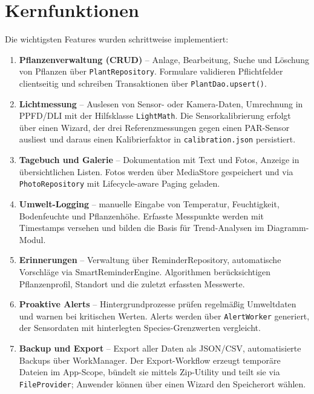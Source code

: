 \documentclass[14pt,a4paper]{report}
\begin{document}
\section{Kernfunktionen}
Die wichtigsten Features wurden schrittweise implementiert:
\begin{enumerate}
    \item \textbf{Pflanzenverwaltung (CRUD)} – Anlage, Bearbeitung, Suche und Löschung von Pflanzen über \texttt{PlantRepository}. Formulare validieren Pflichtfelder clientseitig und schreiben Transaktionen über \texttt{PlantDao.upsert()}.
    \item \textbf{Lichtmessung} – Auslesen von Sensor- oder Kamera-Daten, Umrechnung in PPFD/DLI mit der Hilfsklasse \texttt{LightMath}. Die Sensorkalibrierung erfolgt über einen Wizard, der drei Referenzmessungen gegen einen PAR-Sensor ausliest und daraus einen Kalibrierfaktor in \texttt{calibration.json} persistiert.
    \item \textbf{Tagebuch und Galerie} – Dokumentation mit Text und Fotos, Anzeige in übersichtlichen Listen. Fotos werden über MediaStore gespeichert und via \texttt{PhotoRepository} mit Lifecycle-aware Paging geladen.
    \item \textbf{Umwelt-Logging} – manuelle Eingabe von Temperatur, Feuchtigkeit, Bodenfeuchte und Pflanzenhöhe. Erfasste Messpunkte werden mit Timestamps versehen und bilden die Basis für Trend-Analysen im Diagramm-Modul.
    \item \textbf{Erinnerungen} – Verwaltung über ReminderRepository, automatische Vorschläge via SmartReminderEngine. Algorithmen berücksichtigen Pflanzenprofil, Standort und die zuletzt erfassten Messwerte.
    \item \textbf{Proaktive Alerts} – Hintergrundprozesse prüfen regelmäßig Umweltdaten und warnen bei kritischen Werten. Alerts werden über \texttt{AlertWorker} generiert, der Sensordaten mit hinterlegten Species-Grenzwerten vergleicht.
    \item \textbf{Backup und Export} – Export aller Daten als JSON/CSV, automatisierte Backups über WorkManager. Der Export-Workflow erzeugt temporäre Dateien im App-Scope, bündelt sie mittels Zip-Utility und teilt sie via \texttt{FileProvider}; Anwender können über einen Wizard den Speicherort wählen.
\end{enumerate}
\end{document}
